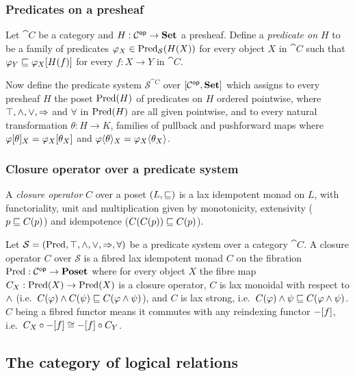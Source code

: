 \subsubsection{Predicates on a presheaf}

Let $\cat{C}$ be a category and $H: \mathcal{C}^{\mathsf{op}} \to \mathbf{Set}$ a presheaf. Define a \emph{predicate on $H$} to be
a family of predicates $\varphi_X \in \mathrm{Pred}_\mathcal{S}(H(X))$ for every object $X$ in $\cat{C}$ such that $\varphi_Y
\sqsubseteq \varphi_X[H(f)]$ for every $f: X \to Y$ in $\cat{C}$.

Now define the predicate system $\mathcal{S}^{\cat{C}}$ over $[\mathcal{C}^{\mathsf{op}},\mathbf{Set}]$ which assigns to every
presheaf $H$ the poset $\mathrm{Pred}(H)$ of predicates on $H$ ordered pointwise, where $\top, \wedge, \vee,
\Rightarrow$ and $\forall$ in $\mathrm{Pred}(H)$ are all given pointwise, and to every natural transformation $\theta: H
\to K$, families of pullback and pushforward maps where $\varphi[\theta]_X = \varphi_X[\theta_X]$ and
$\varphi\langle\theta\rangle_X = \varphi_X\langle\theta_X\rangle$.

\subsubsection{Closure operator over a predicate system}

A \emph{closure operator} $C$ over a poset $(L, \sqsubseteq)$ is a lax idempotent monad on $L$, with functoriality,
unit and multiplication given by monotonicity, extensivity ($p \sqsubseteq C(p)$) and idempotence ($C(C(p)) \sqsubseteq
C(p)$).

Let $\mathcal{S} = (\mathrm{Pred}, \top, \wedge, \vee, \Rightarrow, \forall)$ be a predicate system over a category
$\cat{C}$. A closure operator $C$ over $\mathcal{S}$ is a fibred lax idempotent monad $C$ on the fibration
$\mathrm{Pred}: \mathcal{C}^{\mathsf{op}} \to \mathbf{Poset}$ where for every object $X$ the fibre map $C_X: \mathrm{Pred}(X) \to \mathrm{Pred}(X)$ is a
closure operator, $C$ is lax monoidal with respect to $\wedge$ (i.e.~$C(\varphi) \wedge C(\psi) \sqsubseteq C(\varphi \wedge \psi)$),
and $C$ is lax strong, i.e.~$C(\varphi) \wedge \psi \sqsubseteq C(\varphi \wedge \psi)$. $C$ being a fibred functor means it commutes
with any reindexing functor $-[f]$, i.e.~$C_X \circ -[f] \cong -[f] \circ C_Y$.

\subsection{The category of logical relations}
\label{sec:conservativity:glueing}

